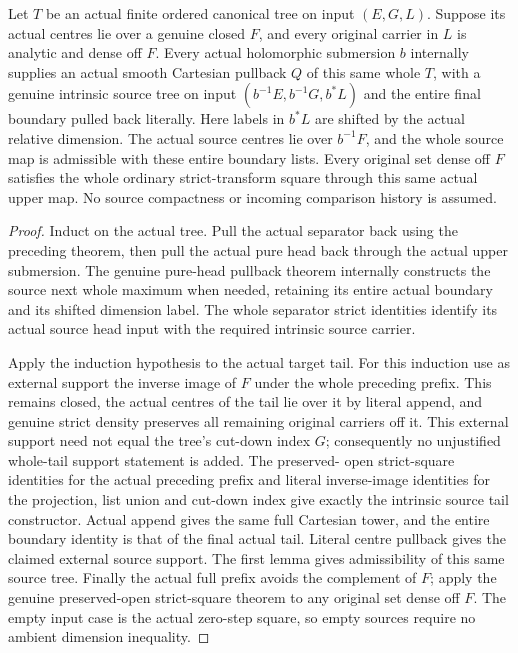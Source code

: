 \begin{theorem}
\label{hir:original-actual-ordered-tree-smooth-pullback}
\leanok
Let $T$ be an actual finite ordered canonical tree on input $(E,G,L)$.
Suppose its actual centres lie over a genuine closed $F$, and every
original carrier in $L$ is analytic and dense off $F$. Every actual
holomorphic submersion $b$ internally supplies an actual smooth
Cartesian pullback $Q$ of this same whole $T$, with a genuine intrinsic
source tree on input $(b^{-1}E,b^{-1}G,b^*L)$ and the entire final
boundary pulled back literally. Here labels in $b^*L$ are shifted
by the actual relative dimension. The actual source centres lie over
$b^{-1}F$, and the whole source map is admissible with these entire
boundary lists. Every original set dense off $F$ satisfies the whole
ordinary strict-transform square through this same actual upper map.
No source compactness or incoming comparison history is assumed.
\end{theorem}
\begin{proof}
Induct on the actual tree. Pull the actual separator back using the
preceding theorem, then pull the actual pure head back through the
actual upper submersion. The genuine pure-head pullback theorem
internally constructs the source next whole maximum when needed,
retaining its entire actual boundary and its shifted dimension label.
The whole separator strict identities identify its actual source
head input with the required intrinsic source carrier.

Apply the induction hypothesis to the actual target tail. For this
induction use as external support the inverse image of $F$ under the
whole preceding prefix. This remains closed, the actual centres of
the tail lie over it by literal append, and genuine strict density
preserves all remaining original carriers off it. This external
support need not equal the tree's cut-down index $G$; consequently
no unjustified whole-tail support statement is added. The preserved-
open strict-square identities for the actual preceding prefix and
literal inverse-image identities for the projection, list union and
cut-down index give exactly the intrinsic source tail constructor.
Actual append gives the same full Cartesian tower, and the entire
boundary identity is that of the final actual tail. Literal centre
pullback gives the claimed external source support. The first lemma
gives admissibility of this same source tree. Finally the actual full
prefix avoids the complement of $F$; apply the genuine preserved-open
strict-square theorem to any original set dense off $F$. The empty
input case is the actual zero-step square, so empty sources require
no ambient dimension inequality.
\end{proof}
